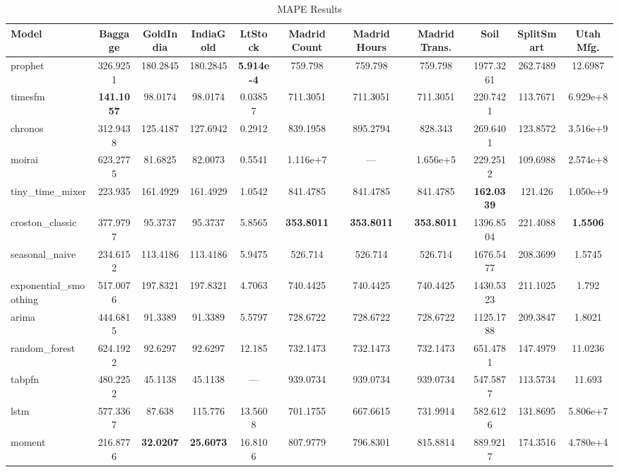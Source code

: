 \begin{table}
\centering
\caption{MAPE Results}
\label{tab:mape}
\begin{adjustbox}{width=0.95\textheight,center}
\small
\begin{tabular}{lcccccccccc}
\toprule
Model & Baggage & GoldIndia & IndiaGold & LtStock & Madrid Count & Madrid Hours & Madrid Trans. & Soil & SplitSmart & Utah Mfg. \\
\midrule
prophet & 326.9251 & 180.2845 & 180.2845 & \textbf{5.914e-4} & 759.798 & 759.798 & 759.798 & 1977.3261 & 262.7489 & 12.6987 \\
timesfm & \textbf{141.1057} & 98.0174 & 98.0174 & 0.03857 & 711.3051 & 711.3051 & 711.3051 & 220.7421 & 113.7671 & 6.929e+8 \\
chronos & 312.9438 & 125.4187 & 127.6942 & 0.2912 & 839.1958 & 895.2794 & 828.343 & 269.6401 & 123.8572 & 3.516e+9 \\
moirai & 623.2775 & 81.6825 & 82.0073 & 0.5541 & 1.116e+7 & --- & 1.656e+5 & 229.2512 & 109.6988 & 2.574e+8 \\
tiny\_time\_mixer & 223.935 & 161.4929 & 161.4929 & 1.0542 & 841.4785 & 841.4785 & 841.4785 & \textbf{162.0339} & 121.426 & 1.050e+9 \\
croston\_classic & 377.9797 & 95.3737 & 95.3737 & 5.8565 & \textbf{353.8011} & \textbf{353.8011} & \textbf{353.8011} & 1396.8504 & 221.4088 & \textbf{1.5506} \\
seasonal\_naive & 234.6152 & 113.4186 & 113.4186 & 5.9475 & 526.714 & 526.714 & 526.714 & 1676.5477 & 208.3699 & 1.5745 \\
exponential\_smoothing & 517.0076 & 197.8321 & 197.8321 & 4.7063 & 740.4425 & 740.4425 & 740.4425 & 1430.5323 & 211.1025 & 1.792 \\
arima & 444.6815 & 91.3389 & 91.3389 & 5.5797 & 728.6722 & 728.6722 & 728.6722 & 1125.1788 & 209.3847 & 1.8021 \\
random\_forest & 624.1922 & 92.6297 & 92.6297 & 12.185 & 732.1473 & 732.1473 & 732.1473 & 651.4781 & 147.4979 & 11.0236 \\
tabpfn & 480.2252 & 45.1138 & 45.1138 & --- & 939.0734 & 939.0734 & 939.0734 & 547.5877 & 113.5734 & 11.693 \\
lstm & 577.3367 & 87.638 & 115.776 & 13.5608 & 701.1755 & 667.6615 & 731.9914 & 582.6126 & 131.8695 & 5.806e+7 \\
moment & 216.8776 & \textbf{32.0207} & \textbf{25.6073} & 16.8106 & 807.9779 & 796.8301 & 815.8814 & 889.9217 & 174.3516 & 4.780e+4 \\

\end{tabular}
\end{adjustbox}
\end{table}
